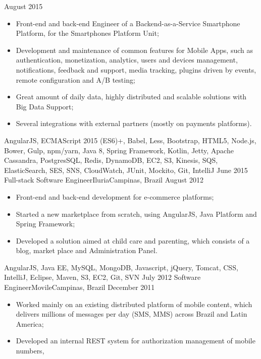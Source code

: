 \begin{experiences}
    {August 2015} {
    \begin{itemize}
      \item Front-end and back-end Engineer of a Backend-as-a-Service Smartphone Platform,
      for the Smartphones Platform Unit;
      \item Development and maintenance of common features for Mobile Apps, such as authentication,
      monetization, analytics, users and devices management, notifications, feedback and support,
      media tracking, plugins driven by events, remote configuration and A/B testing;
      \item Great amount of daily data, highly distributed and scalable solutions with Big Data Support;
      \item Several integrations with external partners (mostly on payments platforms).\\
    \end{itemize}
  }
  {AngularJS, ECMAScript 2015 (ES6)+, Babel, Less, Bootstrap, HTML5, Node.js, Bower, Gulp, npm/yarn, Java 8, Spring Framework, Kotlin, Jetty, Apache Cassandra, PostgresSQL, Redis, DynamoDB, EC2, S3, Kinesis, SQS, ElasticSearch, SES, SNS, CloudWatch, JUnit, Mockito, Git, IntelliJ}
  \emptySeparator
  \experience
    {June 2015} {Full-stack Software Engineer}{Iluria}{Campinas, Brazil}
    {August 2012}    {
      \begin{itemize}
        \item Front-end and back-end development for e-commerce platforms;
        \item Started a new marketplace from scratch, using AngularJS, Java Platform and Spring Framework;
        \item Developed a solution aimed at child care and parenting, which consists of a blog, market place and Administration Panel.\\
      \end{itemize}
    }{AngularJS, Java EE, MySQL, MongoDB, Javascript, jQuery, Tomcat, CSS, IntelliJ, Eclipse, Maven, S3, EC2, Git, SVN}
  \emptySeparator
  \experience
    {July 2012} {Software Engineer}{Movile}{Campinas, Brazil}
    {December 2011}    {
          \begin{itemize}
            \item Worked mainly on an existing distributed platform of mobile content, which delivers millions of
            messages per day (SMS, MMS) across Brazil and Latin America;
            \item Developed an internal REST system for authorization management of mobile numbers,

\end{itemize}}
\end{experiences}
